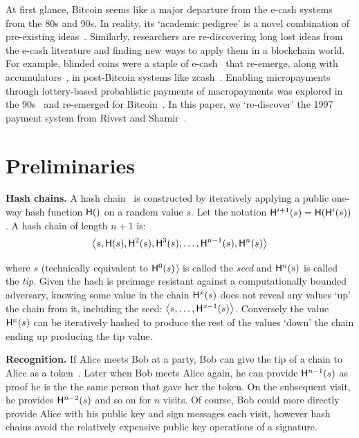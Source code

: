 At first glance, Bitcoin seems like a major departure from the e-cash systems from the 80s and 90s. In reality, its `academic pedigree' is a novel combination of pre-existing ideas~\cite{NaCl17}. Similarly, researchers are re-discovering long lost ideas from the e-cash literature and finding new ways to apply them in a blockchain world. For example, blinded coins were a staple of e-cash~\cite{Cha82} that re-emerge, along with accumulators~\cite{SaTa99}, in post-Bitcoin systems like zcash~\cite{MGGR13,SCG+14}. Enabling micropayments through lottery-based probablistic payments of macropayments was explored in the 90s~\cite{Riv97,Whe97,JaOd97} and re-emerged for Bitcoin~\cite{Pash15}. In this paper, we `re-discover' the 1997 payment system \pw from Rivest and Shamir~\cite{RS96}. 


\section{Preliminaries}

\textbf{Hash chains.} A hash chain~\cite{Lam81} is constructed by iteratively applying a public one-way hash function $\mathsf{H}()$ on a random value $s$. Let the notation $\mathsf{H}^{i+1}(s) = \mathsf{H}(\mathsf{H}^{i}(s))$. A hash chain of length $n+1$ is:
\begin{equation*} \left \langle s,\mathsf{H}(s),\mathsf{H}^{2}(s),\mathsf{H}^{3}(s),\ldots,\mathsf{H}^{n-1}(s),\mathsf{H}^{n}(s) \right \rangle \end{equation*}

where $s$ (technically equivalent to $\mathsf{H}^{0}(s)$) is called the \textit{seed} and $\mathsf{H}^{n}(s)$ is called the \textit{tip}. Given the hash is preimage resistant against a computationally bounded adversary, knowing some value in the chain $\mathsf{H}^{x}(s)$ does not reveal any values `up' the chain from it, including the seed: $\left \langle s,\ldots,\mathsf{H}^{x-1}(s) \right \rangle$. Conversely the value $\mathsf{H}^{x}(s)$ can be iteratively hashed to produce the rest of the values `down' the chain ending up producing the tip value. 

\textbf{Recognition.} If Alice meets Bob at a party, Bob can give the tip of a chain to Alice as a token~\cite{ABC+98}. Later when Bob meets Alice again, he can provide $\mathsf{H}^{n-1}(s)$ as proof he is the the same person that gave her the token. On the subsequent visit, he provides $\mathsf{H}^{n-2}(s)$ and so on for $n$ visits. Of course, Bob could more directly provide Alice with his public key and sign messages each visit, however hash chains avoid the relatively expensive public key operations of a signature.

